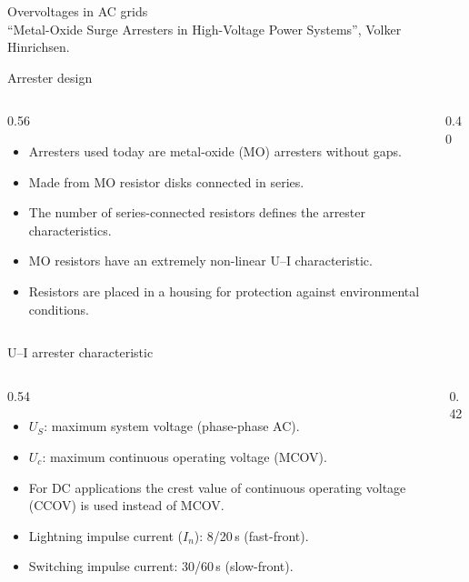 \begin{frame}{Overvoltages in AC grids}
  \centering
  \\[0.3em]
  {\color{atGray}\footnotesize ``Metal-Oxide Surge Arresters in High-Voltage
  Power Systems'', Volker Hinrichsen.}
\end{frame}

\begin{frame}{Arrester design}
  \begin{columns}[c,onlytextwidth]
    \begin{column}{0.56\textwidth}
      \begin{itemize}
        \setlength{\itemsep}{0.4em}
        \item Arresters used today are metal-oxide (MO) arresters without gaps.
        \item Made from MO resistor disks connected in series.
        \item The number of series-connected resistors defines the arrester
              characteristics.
        \item MO resistors have an extremely non-linear U--I characteristic.
        \item Resistors are placed in a housing for protection against
              environmental conditions.
      \end{itemize}
    \end{column}
    \begin{column}{0.40\textwidth}
      \centering
    \end{column}
  \end{columns}
\end{frame}

\begin{frame}{U--I arrester characteristic}
  \begin{columns}[c,onlytextwidth]
    \begin{column}{0.54\textwidth}
      \begin{itemize}
        \setlength{\itemsep}{0.35em}
        \item $U_S$: maximum system voltage (phase-phase AC).
        \item $U_c$: maximum continuous operating voltage (MCOV).
        \item For DC applications the crest value of continuous operating
              voltage (CCOV) is used instead of MCOV.
        \item Lightning impulse current ($I_n$): 8/20\,\textmu s
              (fast-front).
        \item Switching impulse current: 30/60\,\textmu s (slow-front).
      \end{itemize}
    \end{column}
    \begin{column}{0.42\textwidth}
      \centering
    \end{column}
  \end{columns}
\end{frame}

